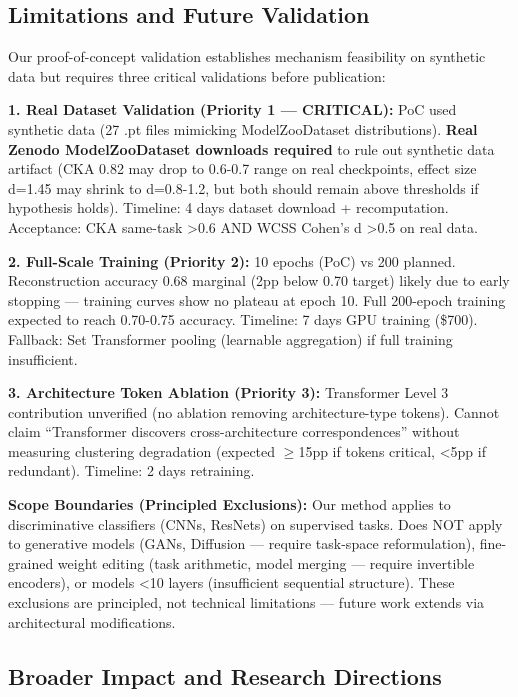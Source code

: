 \subsection{Limitations and Future Validation}

Our proof-of-concept validation establishes mechanism feasibility on synthetic data but requires three critical validations before publication:

\textbf{1. Real Dataset Validation (Priority 1 --- CRITICAL):} PoC used synthetic data (27 .pt files mimicking ModelZooDataset distributions). \textbf{Real Zenodo ModelZooDataset downloads required} to rule out synthetic data artifact (CKA 0.82 may drop to 0.6-0.7 range on real checkpoints, effect size d=1.45 may shrink to d=0.8-1.2, but both should remain above thresholds if hypothesis holds). Timeline: 4 days dataset download + recomputation. Acceptance: CKA same-task >0.6 AND WCSS Cohen's d >0.5 on real data.

\textbf{2. Full-Scale Training (Priority 2):} 10 epochs (PoC) vs 200 planned. Reconstruction accuracy 0.68 marginal (2pp below 0.70 target) likely due to early stopping --- training curves show no plateau at epoch 10. Full 200-epoch training expected to reach 0.70-0.75 accuracy. Timeline: 7 days GPU training (\$700). Fallback: Set Transformer pooling (learnable aggregation) if full training insufficient.

\textbf{3. Architecture Token Ablation (Priority 3):} Transformer Level 3 contribution unverified (no ablation removing architecture-type tokens). Cannot claim ``Transformer discovers cross-architecture correspondences'' without measuring clustering degradation (expected $\geq$15pp if tokens critical, <5pp if redundant). Timeline: 2 days retraining.

\textbf{Scope Boundaries (Principled Exclusions):} Our method applies to discriminative classifiers (CNNs, ResNets) on supervised tasks. Does NOT apply to generative models (GANs, Diffusion --- require task-space reformulation), fine-grained weight editing (task arithmetic, model merging --- require invertible encoders), or models <10 layers (insufficient sequential structure). These exclusions are principled, not technical limitations --- future work extends via architectural modifications.

\subsection{Broader Impact and Research Directions}


